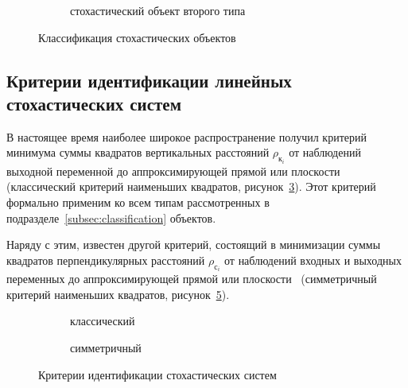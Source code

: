 \begin{figure}[p]
  \vspace{2\baselineskip}
  \begin{subfigure}[b]{\linewidth}
    \centering
    \caption{стохастический объект второго типа}\label{fig:type_second}
  \end{subfigure}

  \vspace{\baselineskip}
  \caption{Классификация стохастических объектов}
\end{figure}

\subsection{Критерии идентификации линейных стохастических систем}

В настоящее время наиболее широкое распространение получил критерий
минимума суммы квадратов вертикальных расстояний \( \rho_{\text{к}_i} \)
от наблюдений выходной переменной до аппроксимирующей прямой или плоскости
(классический критерий наименьших квадратов, рисунок~\ref{fig:criteria_classic}).
Этот критерий формально применим ко всем типам рассмотренных в
подразделе~\ref{subsec:classification} объектов.

Наряду с этим, известен другой критерий, состоящий в минимизации суммы квадратов
перпендикулярных расстояний \( \rho_{\text{с}_i} \) от наблюдений входных и выходных переменных до
аппроксимирующей прямой или плоскости~\cite{pearson_1901, mukha_2016}
(симметричный критерий наименьших квадратов, рисунок~\ref{fig:criteria_symmetric}).

\begin{figure}[h]
  \begin{subfigure}[b]{0.5\linewidth}
    \centering
    \caption{классический}\label{fig:criteria_classic}
  \end{subfigure}
  \hfill
  \begin{subfigure}[b]{0.5\linewidth}
    \centering
    \caption{симметричный}\label{fig:criteria_symmetric}
  \end{subfigure}

  \vspace{\baselineskip}
  \caption{Критерии идентификации стохастических систем}
\end{figure}

